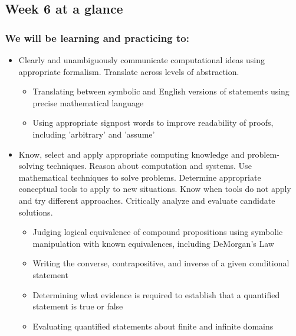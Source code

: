 \documentclass[12pt, oneside]{article}
\begin{document}
\begin{flushright}
\end{flushright} 
\subsection*{Week 6 at a glance}

\subsubsection*{We will be learning and practicing to:}
\begin{itemize}

\item Clearly and unambiguously communicate computational ideas using appropriate formalism. Translate across levels of abstraction.
\begin{itemize}
   \item Translating between symbolic and English versions of statements using precise mathematical language
    \item Using appropriate signpost words to improve readability of proofs, including 'arbitrary' and 'assume'
\end{itemize}

\item Know, select and apply appropriate computing knowledge and problem-solving techniques. Reason about computation and systems. Use mathematical techniques to solve problems. Determine appropriate conceptual tools to apply to new situations. Know when tools do not apply and try different approaches. Critically analyze and evaluate candidate solutions.
\begin{itemize}
    \item Judging logical equivalence of compound propositions using symbolic manipulation with known equivalences, including DeMorgan's Law
    \item Writing the converse, contrapositive, and inverse of a given conditional statement
    \item Determining what evidence is required to establish that a quantified statement is true or false
    \item Evaluating quantified statements about finite and infinite domains
\end{itemize}


\end{itemize}
\end{document}
